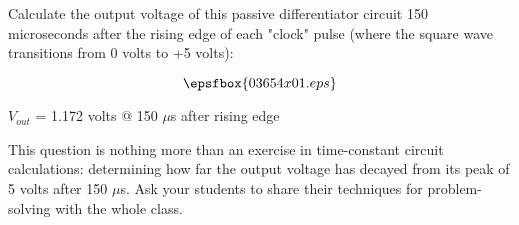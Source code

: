 

Calculate the output voltage of this passive differentiator circuit 150 microseconds after the rising edge of each "clock" pulse (where the square wave transitions from 0 volts to +5 volts):

$$\epsfbox{03654x01.eps}$$







$V_{out}$ = 1.172 volts @ 150 $\mu$s after rising edge







This question is nothing more than an exercise in time-constant circuit calculations: determining how far the output voltage has decayed from its peak of 5 volts after 150 $\mu$s.  Ask your students to share their techniques for problem-solving with the whole class.




